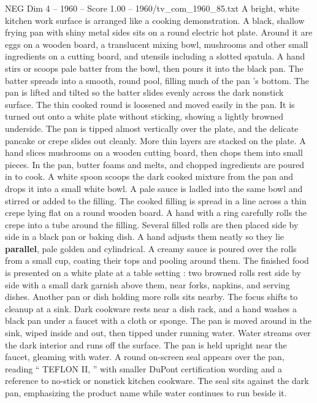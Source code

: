 \begin{textsample}{NEG Dim 4 – 1960 – Score 1.00 – 1960/tv\_com\_1960\_85.txt}  \label{ex:f4_neg_039}
A bright, white kitchen work surface is arranged like a cooking demonstration.
A black, shallow frying pan with shiny metal sides sits on a round electric hot plate.
Around it are eggs on a wooden board, a translucent mixing bowl, mushrooms and other small ingredients on a cutting board, and utensils including a slotted spatula.
A hand stirs or scoops pale batter from the bowl, then pours it into the black pan.
The batter spreads into a smooth, round pool, filling much of the pan ’s bottom.
The pan is lifted and tilted so the batter slides evenly across the dark nonstick surface.
The thin cooked round is loosened and moved easily in the pan.
It is turned out onto a white plate without sticking, showing a lightly browned underside.
The pan is tipped almost vertically over the plate, and the delicate pancake or crepe slides out cleanly.
More thin layers are stacked on the plate.
A hand slices mushrooms on a wooden cutting board, then chops them into small pieces.
In the pan, butter foams and melts, and chopped ingredients are poured in to cook.
A white spoon scoops the dark cooked mixture from the pan and drops it into a small white bowl.
A pale sauce is ladled into the same bowl and stirred or added to the filling.
The cooked filling is spread in a line across a thin crepe lying flat on a round wooden board.
A hand with a ring carefully rolls the crepe into a tube around the filling.
Several filled rolls are then placed side by side in a black pan or baking dish.
A hand adjusts them neatly so they lie \textbf{parallel}, pale golden and cylindrical.
A creamy sauce is poured over the rolls from a small cup, coating their tops and pooling around them.
The finished food is presented on a white plate at a table setting : two browned rolls rest side by side with a small dark garnish above them, near forks, napkins, and serving dishes.
Another pan or dish holding more rolls sits nearby.
The focus shifts to cleanup at a sink.
Dark cookware rests near a dish rack, and a hand washes a black pan under a faucet with a cloth or sponge.
The pan is moved around in the sink, wiped inside and out, then tipped under running water.
Water streams over the dark interior and runs off the surface.
The pan is held upright near the faucet, gleaming with water.
A round on-screen seal appears over the pan, reading “ TEFLON II, ” with smaller DuPont certification wording and a reference to no-stick or nonstick kitchen cookware.
The seal sits against the dark pan, emphasizing the product name while water continues to run beside it.

\end{textsample}

